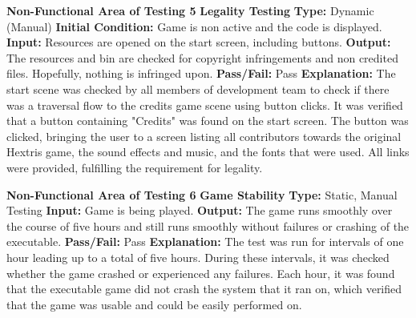 \documentclass[12pt, titlepage]{article}
\begin{document}
\noindent \textbf{Non-Functional Area of Testing 5}
\textbf{Legality Testing}
\newline
\textbf{Type:} Dynamic (Manual)
\newline 
\textbf{Initial Condition:} Game is non active and the code is displayed.
\newline
\textbf{Input:} Resources are opened on the start screen, including buttons.
\newline
\textbf{Output:} The resources and bin are checked for copyright infringements and non credited files. Hopefully, nothing is infringed upon.
\newline
\textbf{Pass/Fail:} Pass
\newline
\textbf{Explanation:} The start scene was checked by all members of development team to check if there was a traversal flow to the credits game scene using button clicks. It was verified that a button containing "Credits" was found on the start screen. The button was clicked, bringing the user to a screen listing all contributors towards the original Hextris game, the sound effects and music, and the fonts that were used. All links were provided, fulfilling the requirement for legality. \newline \newline


\noindent \textbf{Non-Functional Area of Testing 6}
\newline
\textbf{Game Stability}
\newline
\textbf{Type:} Static, Manual Testing
\newline
\textbf{Input:} Game is being played.
\newline
\textbf{Output:} The game runs smoothly over the course of five hours and still runs smoothly without failures or crashing of the executable.
\newline 
\textbf{Pass/Fail:} Pass
\newline
\textbf{Explanation:} The test was run for intervals of one hour leading up to a total of five hours. During these intervals, it was checked whether the game crashed or experienced any failures. Each hour, it was found that the executable game did not crash the system that it ran on, which verified that the game was usable and could be easily performed on.\newline \newline \newline
\end{document}
